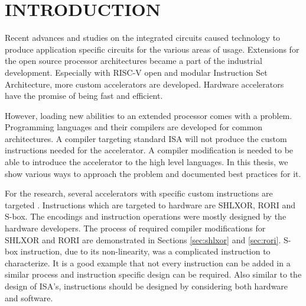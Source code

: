 \chapter{INTRODUCTION}\label{Ch1}

Recent advances and studies on the integrated circuits caused technology to produce application specific circuits for the various areas of usage. Extensions for the open source processor architectures became a part of the industrial development. Especially with RISC-V open and modular Instruction Set Architecture, more custom accelerators are developed. Hardware accelerators have the promise of being fast and efficient.

However, loading new abilities to an extended processor comes with a problem. Programming languages and their compilers are developed for common architectures. A compiler targeting standard ISA will not produce the custom instructions needed for the accelerator. A compiler modification is needed to be able to introduce the accelerator to the high level languages. In this thesis, we show various ways to approach the problem and documented best practices for it. 


For the research, several accelerators with specific custom instructions are targeted \cite{Sairoglu, eryilmaz}. Instructions which are targeted to hardware are SHLXOR, RORI and S-box. The encodings and instruction operations were mostly designed by the hardware developers. The process of required compiler modifications for SHLXOR and RORI are demonstrated in Sections \ref{sec:shlxor} and \ref{sec:rori}. S-box instruction, due to its non-linearity, was a complicated instruction to characterize. It is a good example that not every instruction can be added in a similar process and instruction specific design can be required. 
Also similar to the design of ISA's, instructions should be designed by considering both hardware and software. 

